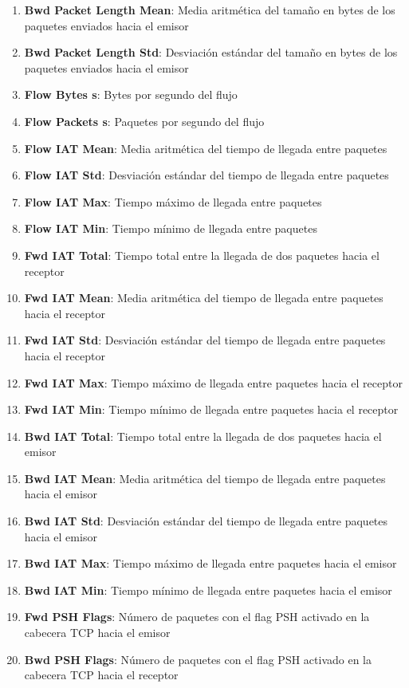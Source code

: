 \begin{enumerate}
    \item \textbf{Bwd Packet Length Mean}: Media aritmética del tamaño en bytes de los paquetes enviados hacia el emisor
    \item \textbf{Bwd Packet Length Std}: Desviación estándar del tamaño en bytes de los paquetes enviados hacia el emisor
    \item \textbf{Flow Bytes s}: Bytes por segundo del flujo
    \item \textbf{Flow Packets s}: Paquetes por segundo del flujo
    \item \textbf{Flow IAT Mean}: Media aritmética del tiempo de llegada entre paquetes
    \item \textbf{Flow IAT Std}: Desviación estándar del tiempo de llegada entre paquetes
    \item \textbf{Flow IAT Max}: Tiempo máximo de llegada entre paquetes
    \item \textbf{Flow IAT Min}: Tiempo mínimo de llegada entre paquetes
    \item \textbf{Fwd IAT Total}: Tiempo total entre la llegada de dos paquetes hacia el receptor
    \item \textbf{Fwd IAT Mean}: Media aritmética del tiempo de llegada entre paquetes hacia el receptor
    \item \textbf{Fwd IAT Std}: Desviación estándar del tiempo de llegada entre paquetes hacia el receptor
    \item \textbf{Fwd IAT Max}: Tiempo máximo de llegada entre paquetes hacia el receptor
    \item \textbf{Fwd IAT Min}: Tiempo mínimo de llegada entre paquetes hacia el receptor
    \item \textbf{Bwd IAT Total}: Tiempo total entre la llegada de dos paquetes hacia el emisor
    \item \textbf{Bwd IAT Mean}: Media aritmética del tiempo de llegada entre paquetes hacia el emisor
    \item \textbf{Bwd IAT Std}: Desviación estándar del tiempo de llegada entre paquetes hacia el emisor
    \item \textbf{Bwd IAT Max}: Tiempo máximo de llegada entre paquetes hacia el emisor
    \item \textbf{Bwd IAT Min}: Tiempo mínimo de llegada entre paquetes hacia el emisor
    \item \textbf{Fwd PSH Flags}: Número de paquetes con el flag PSH activado en la cabecera TCP hacia el emisor
    \item \textbf{Bwd PSH Flags}: Número de paquetes con el flag PSH activado en la cabecera TCP hacia el receptor

\end{enumerate}
